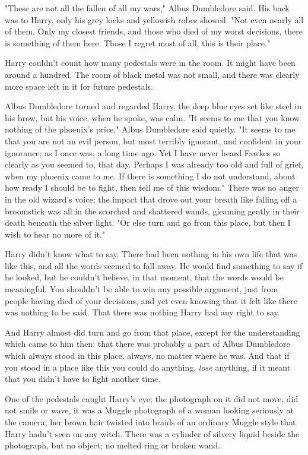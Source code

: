 "These are not all the fallen of all my wars," Albus Dumbledore said. His back 
was to Harry, only his grey locks and yellowish robes showed. "Not even nearly 
all of them. Only my closest friends, and those who died of my worst decisions, 
there is something of them here. Those I regret most of all, this is their 
place."

Harry couldn't count how many pedestals were in the room. It might have been 
around a hundred. The room of black metal was not small, and there was clearly 
more space left in it for future pedestals.

Albus Dumbledore turned and regarded Harry, the deep blue eyes set like steel 
in his brow, but his voice, when he spoke, was calm. "It seems to me that you 
know nothing of the phoenix's price," Albus Dumbledore said quietly. "It seems 
to me that you are not an evil person, but most terribly ignorant, and 
confident in your ignorance; as I once was, a long time ago. Yet I have never 
heard Fawkes so clearly as you seemed to, that day. Perhaps I was already too 
old and full of grief, when my phoenix came to me. If there is something I do 
not understand, about how ready I should be to fight, then tell me of this 
wisdom." There was no anger in the old wizard's voice; the impact that drove 
out your breath like falling off a broomstick was all in the scorched and 
shattered wands, gleaming gently in their death beneath the silver light. "Or 
else turn and go from this place, but then I wish to hear no more of it."

Harry didn't know what to say. There had been nothing in his own life that was 
like this, and all the words seemed to fall away. He would find something to 
say if he looked, but he couldn't believe, in that moment, that the words would 
be meaningful. You shouldn't be able to win any possible argument, just from 
people having died of your decisions, and yet even knowing that it felt like 
there was nothing to be said. That there was nothing Harry had any right to say.

And Harry almost did turn and go from that place, except for the understanding 
which came to him then: that there was probably a part of Albus Dumbledore 
which always stood in this place, always, no matter where he was. And that if 
you stood in a place like this you could do anything, \emph{lose} anything, if 
it meant that you didn't have to fight another time.

One of the pedestals caught Harry's eye; the photograph on it did not move, did 
not smile or wave, it was a Muggle photograph of a woman looking seriously at 
the camera, her brown hair twisted into braids of an ordinary Muggle style that 
Harry hadn't seen on any witch. There was a cylinder of silvery liquid beside 
the photograph, but no object; no melted ring or broken wand.

